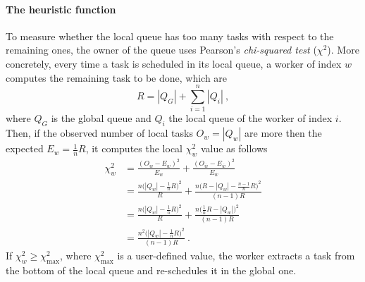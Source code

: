 \documentclass[11pt, a4paper]{article}
\begin{document}
\paragraph{The heuristic function} To measure whether the local queue has too many tasks with respect to the remaining ones, the owner of the queue uses Pearson's \emph{chi-squared test} ($\chi^2$). More concretely, every time a task is scheduled in its local queue, a worker of index $w$ computes the remaining task to be done, which are
%
$$R = |Q_G| + \sum^n_{i = 1}|Q_i|\ , $$
%
where $Q_G$ is the global queue and $Q_i$ the local queue of the worker of index $i$. Then, if the observed number of local tasks $O_w = |Q_w|$ are more then the expected $E_w = \frac{1}{n}R$, it computes the local $\chi^2_w$ value as follows
%
\begin{align*}
	\chi^2_w &= \frac{(O_w - E_w)^2}{E_w} + \frac{(O_{\overline{w}} - E_{\overline{w}})^2}{E_{\overline{w}}} \\
	&= \frac{n\big(|Q_w| - \frac{1}{n}R\big)^2}{R} + \frac{n\big(R - |Q_w| - \frac{n-1}{n}R\big)^2}{(n-1)R} \\
	&= \frac{n\big(|Q_w| - \frac{1}{n}R\big)^2}{R} + \frac{n\big(\frac{1}{n}R - |Q_w|\big)^2}{(n-1)R} \\
	&= \frac{n^2\big(|Q_w| - \frac{1}{n}R\big)^2}{(n-1)R}\ .
\end{align*}
%
If $\chi^2_w \ge \chi^2_\text{max}$, where $\chi^2_\text{max}$ is a user-defined value, the worker extracts a task from the bottom of the local queue and re-schedules it in the global one.
\end{document}
